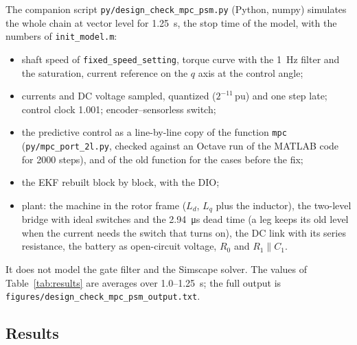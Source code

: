 \documentclass[11pt,a4paper]{scrartcl}
\newcommand{\code}[1]{\texttt{#1}}
\newcommand{\pun}{\,\mathrm{pu}}
\begin{document}
\begin{onehalfspace}
The companion script \code{py/design\_check\_mpc\_psm.py} (Python, numpy) simulates the whole chain at vector level for \SI{1.25}{\second}, the stop time of the model, with the numbers of \code{init\_model.m}:
\begin{itemize}[nosep]
	\item shaft speed of \code{fixed\_speed\_setting}, torque curve with the \SI{1}{\hertz} filter and the saturation, current reference on the $q$ axis at the control angle;
	\item currents and DC voltage sampled, quantized ($2^{-11}\pun$) and one step late; control clock 1.001; encoder--sensorless switch;
	\item the predictive control as a line-by-line copy of the function \code{mpc} (\code{py/mpc\_port\_2l.py}, checked against an Octave run of the MATLAB code for 2000 steps), and of the old function for the cases before the fix;
	\item the EKF rebuilt block by block, with the DIO;
	\item plant: the machine in the rotor frame ($L_d$, $L_q$ plus the inductor), the two-level bridge with ideal switches and the \SI{2.94}{\micro\second} dead time (a leg keeps its old level when the current needs the switch that turns on), the DC link with its series resistance, the battery as open-circuit voltage, $R_0$ and $R_1 \parallel C_1$.
\end{itemize}
It does not model the gate filter and the Simscape solver. The values of Table~\ref{tab:results} are averages over 1.0--\SI{1.25}{\second}; the full output is \code{figures/design\_check\_mpc\_psm\_output.txt}.

\subsection{Results}


\end{onehalfspace}
\end{document}
